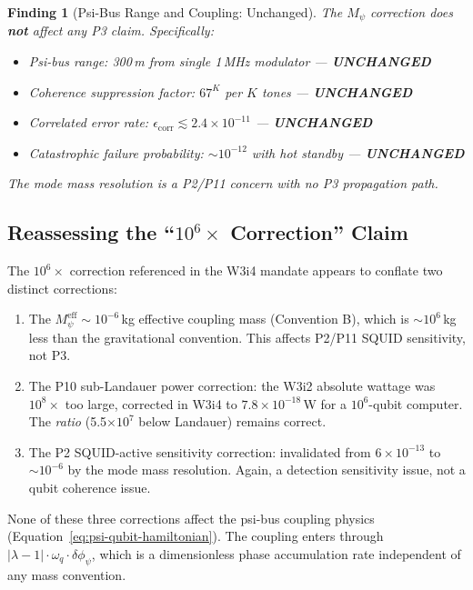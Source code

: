 \documentclass[11pt]{article}
\newtheorem{finding}[theorem]{Finding}
\theoremstyle{definition}
\theoremstyle{remark}
\begin{document}
\begin{finding}[Psi-Bus Range and Coupling: Unchanged]
\label{finding:psi-bus-unchanged}
The $M_\psi$ correction does \textbf{not} affect any P3 claim.
Specifically:
\begin{itemize}
  \item Psi-bus range: 300\,m from single 1\,MHz modulator ---
    \textbf{UNCHANGED}
  \item Coherence suppression factor: $67^K$ per $K$ tones ---
    \textbf{UNCHANGED}
  \item Correlated error rate: $\epsilon_{\mathrm{corr}} \lesssim
    2.4\times10^{-11}$ --- \textbf{UNCHANGED}
  \item Catastrophic failure probability: $\sim 10^{-12}$ with
    hot standby --- \textbf{UNCHANGED}
\end{itemize}
The mode mass resolution is a P2/P11 concern with no P3 propagation path.
\end{finding}

\subsection{Reassessing the ``$10^6\times$ Correction'' Claim}
\label{sec:10e6-reassessment}

The $10^6\times$ correction referenced in the W3i4 mandate appears to
conflate two distinct corrections:

\begin{enumerate}
  \item The $M_\psi^{\mathrm{eff}} \sim 10^{-6}$\,kg effective coupling
    mass (Convention B), which is $\sim 10^{6}$\,kg less than the gravitational
    convention.  This affects P2/P11 SQUID sensitivity, not P3.

  \item The P10 sub-Landauer power correction: the W3i2 absolute wattage
    was $10^8\times$ too large, corrected in W3i4 to $7.8\times10^{-18}$\,W
    for a $10^6$-qubit computer.  The \emph{ratio} (5.5$\times10^7$ below
    Landauer) remains correct.

  \item The P2 SQUID-active sensitivity correction: invalidated from
    $6\times10^{-13}$ to $\sim10^{-6}$ by the mode mass resolution.  Again,
    a detection sensitivity issue, not a qubit coherence issue.
\end{enumerate}

None of these three corrections affect the psi-bus coupling physics
(Equation~\ref{eq:psi-qubit-hamiltonian}).  The coupling enters through
$|\lambda-1| \cdot \omega_q \cdot \delta\phi_\psi$, which is a dimensionless
phase accumulation rate independent of any mass convention.
\end{document}
